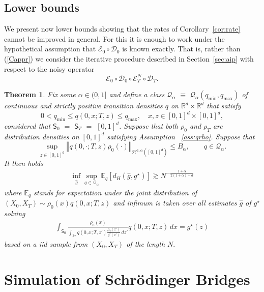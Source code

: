 \documentclass[a4paper,11pt]{amsart}
\theoremstyle{plain}
\newtheorem{thm}[theorem]{Theorem}
\theoremstyle{remark}
\begin{document}
\subsection{Lower bounds}
We  present now lower bounds showing that the rates of Corollary~\ref{cor:rate} cannot be improved in general. 
For this it is enough to work under the hypothetical assumption
that $\mathcal{E}_{0}\circ\mathcal{D}_{0}$ is known exactly. That is, rather
than (\ref{Cappr}) we consider the iterative procedure described in
Section~\ref{sec:aip} with respect to the noisy operator%
\[
\mathcal{E}_{0}\circ\mathcal{D}_{0}\circ\mathcal{E}_{T}^{N}\circ
\mathcal{D}_{T}.
\]
%
\begin{thm}
\label{thm:lb}
Fix some $\alpha\in (0,1]$ and define a class $\mathcal{Q}_{\alpha}$ $\equiv$ \(\mathcal{Q}_{\alpha}(q_{\min},q_{\max})\) of continuous and strictly positive transition densities $q$ on \(\mathbb{R}^d\times \mathbb{R}^d\)  that satisfy
\[
0<q_{\min}\leq q(0,x;T,z) \leq q_{\max},\quad x,z\in [0,1]^d\times [0,1]^d,
\] 
considered that $\mathsf{S}_{0}$ $=$ $\mathsf{S}_{T}$ $=$ $[0,1]^d$. 
Suppose that both $\rho_{0}$ and $\rho_{T}$ are distribution densities on
$[0,1]^{d}$ satisfying Assumption ~\ref{ass:qrho}. 
Suppose that
\[
 \sup_{z\in [0,1]^d}\left\Vert q(0,\cdot;T,z)\rho_{0}%
(\cdot)\right\Vert _{\mathcal{H}^{1,\alpha}([0,1]^d)}  \leq B_{\alpha},\qquad q\in\mathcal{Q}_{\alpha}.
\]
It then holds
\begin{eqnarray}
\label{eq:lower-bound}
\inf_{\widehat{g}}\sup_{q\in \mathcal{Q}_{\alpha}}\mathbb{E}_q\left[d_H(\widehat{g},g^{\star})\right]\gtrsim N^{-\frac{1+\alpha}{2(1+\alpha)+d}}
\end{eqnarray}
where \(\mathbb{E}_q\) stands for expectation under the joint distribution of \((X_0,X_T)\sim \rho_0(x)q(0,x;T,z)\) and infimum is taken over all  estimates $\widehat{g}$ of \(g^{\star}\) solving 
\begin{eqnarray*}
\int_{\mathsf{S}_{0}}%
\frac{\rho_{0}(x)}{\int_{\mathsf{S}_{T}}q(0,x;T,z')\frac{\rho_{T}(z')}{g^{\star}(z')}\, dz'}
q(0,x;T,z)\, dx=g^{\star}(z)
\end{eqnarray*}
based on a iid sample from \((X_0,X_T)\) of the length \(N.\)
\end{thm}

\section{Simulation of Schr\"odinger Bridges}\label{SBsim}
\end{document}
